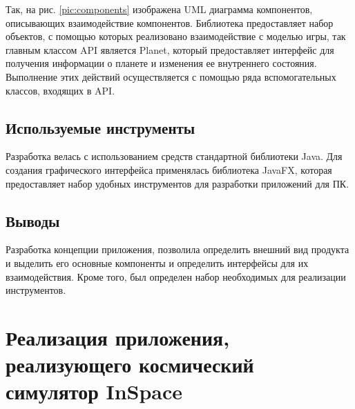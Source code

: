 Так, на рис. \ref{pic:components} изображена UML диаграмма компонентов, описывающих взаимодействие компонентов. Библиотека предоставляет набор объектов, с помощью которых реализовано взаимодействие с моделью игры, так главным классом API является Planet, который предоставляет интерфейс для получения информации о планете и изменения ее внутреннего состояния. Выполнение этих действий осуществляется с помощью ряда вспомогательных классов, входящих в API.   


%
%
%

\subsection{Используемые инструменты}

Разработка велась с использованием средств стандартной библиотеки Java. Для создания графического интерфейса применялась библиотека JavaFX, которая предоставляет набор удобных инструментов для разработки приложений для ПК.

\subsection{Выводы} 
Разработка концепции приложения, позволила определить внешний вид продукта и выделить его основные компоненты и определить интерфейсы для их взаимодействия. Кроме того, был определен набор необходимых для реализации инструментов.

\section{Реализация приложения, реализующего космический симулятор InSpace}

